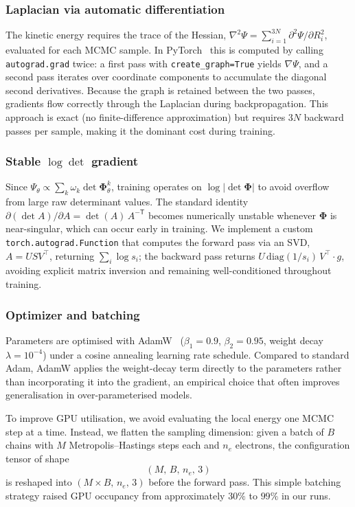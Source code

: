 \subsubsection{Laplacian via automatic differentiation}

The kinetic energy requires the trace of the Hessian, $\nabla^2\Psi = \sum_{i=1}^{3N}\partial^2\Psi/\partial R_i^2$, evaluated for each MCMC sample. In PyTorch~\cite{pytorch} this is computed by calling \texttt{autograd.grad} twice: a first pass with \texttt{create\_graph=True} yields $\nabla\Psi$, and a second pass iterates over coordinate components to accumulate the diagonal second derivatives. Because the graph is retained between the two passes, gradients flow correctly through the Laplacian during backpropagation. This approach is exact (no finite-difference approximation) but requires $3N$ backward passes per sample, making it the dominant cost during training.

\subsubsection{Stable $\log\det$ gradient}

Since $\Psi_\theta \propto \sum_k \omega_k \det\boldsymbol{\Phi}_\theta^k$, training operates on $\log|\det\boldsymbol{\Phi}|$ to avoid overflow from large raw determinant values. The standard identity $\partial(\det A)/\partial A = \det(A)\,A^{-\mathsf T}$ becomes numerically unstable whenever $\boldsymbol{\Phi}$ is near-singular, which can occur early in training. We implement a custom \texttt{torch.autograd.Function} that computes the forward pass via an SVD, $A = U S V^\top$, returning $\sum_i \log s_i$; the backward pass returns $U \,\mathrm{diag}(1/s_i)\, V^\top \cdot g$, avoiding explicit matrix inversion and remaining well-conditioned throughout training.

\subsubsection{Optimizer and batching}

Parameters are optimised with AdamW~\cite{adamw} ($\beta_1=0.9$, $\beta_2=0.95$, weight decay $\lambda=10^{-4}$) under a cosine annealing learning rate schedule. Compared to standard Adam, AdamW applies the weight-decay term directly to the parameters rather than incorporating it into the gradient, an empirical choice that often improves generalisation in over-parameterised models.

To improve GPU utilisation, we avoid evaluating the local energy one MCMC step at a time. Instead, we flatten the sampling dimension: given a batch of $B$ chains with $M$ Metropolis--Hastings steps each and $n_e$ electrons, the configuration tensor of shape
\begin{equation}
	(M,\, B,\, n_e,\, 3)
	\label{eq:batching}
\end{equation}
is reshaped into $(M\times B,\, n_e,\, 3)$ before the forward pass. This simple batching strategy raised GPU occupancy from approximately $30\%$ to $99\%$ in our runs.

